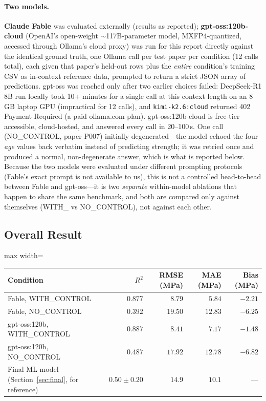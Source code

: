 \documentclass[11pt]{article}
\newcommand{\R}{$R^2$}
\begin{document}
\paragraph{Two models.} \textbf{Claude Fable} was evaluated externally (results as
reported); \textbf{gpt-oss:120b-cloud} (OpenAI's open-weight $\sim$117B-parameter
model, MXFP4-quantized, accessed through Ollama's cloud proxy) was run for this report
directly against the identical ground truth, one Ollama call per test paper per
condition (12 calls total), each given that paper's held-out rows plus the \emph{entire}
condition's training CSV as in-context reference data, prompted to return a strict JSON
array of predictions. gpt-oss was reached only after two earlier choices failed:
DeepSeek-R1 8B run locally took 10+ minutes for a single call at this context length on
an 8\,GB laptop GPU (impractical for 12 calls), and \texttt{kimi-k2.6:cloud} returned
402 Payment Required (a paid ollama.com plan). gpt-oss:120b-cloud is free-tier
accessible, cloud-hosted, and answered every call in 20--100\,s. One call (NO\_CONTROL,
paper P007) initially degenerated---the model echoed the four \emph{age} values back
verbatim instead of predicting strength; it was retried once and produced a normal,
non-degenerate answer, which is what is reported below. Because the two models were
evaluated under different prompting protocols (Fable's exact prompt is not available to
us), this is not a controlled head-to-head between Fable and gpt-oss---it is two
\emph{separate} within-model ablations that happen to share the same benchmark, and
both are compared only against themselves (WITH\_ vs NO\_CONTROL), not against each
other.

\subsection{Overall Result}
\begin{center}\small
\begin{adjustbox}{max width=\linewidth}
\begin{tabular}{lrrrr}
\toprule
Condition & \R{} & RMSE (MPa) & MAE (MPa) & Bias (MPa) \\
\midrule
\rowcolor{green!12}Fable, WITH\_CONTROL & $\mathbf{0.877}$ & $\mathbf{8.79}$ & $\mathbf{5.84}$ & $-2.21$ \\
Fable, NO\_CONTROL & $0.392$ & $19.50$ & $12.83$ & $-6.25$ \\
\rowcolor{green!12}gpt-oss:120b, WITH\_CONTROL & $\mathbf{0.887}$ & $\mathbf{8.41}$ & $7.17$ & $-1.48$ \\
gpt-oss:120b, NO\_CONTROL & $0.487$ & $17.92$ & $12.78$ & $-6.82$ \\
\midrule
Final ML model (Section~\ref{sec:final}, for reference) & $0.50\pm0.20$ & $14.9$ & $10.1$ & --- \\
\bottomrule
\end{tabular}
\end{adjustbox}
\end{center}
\end{document}
